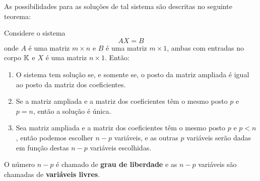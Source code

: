 As possibilidades para as solu\c{c}\~oes de tal sistema s\~ao descritas no seguinte teorema:

\begin{teorema}
	Considere o sistema
	\[
		AX = B
	\]
	onde $A$ \'e uma matriz $m \times n$ e $B$ \'e uma matriz $m \times 1$, ambas com entradas no corpo $\mathbb{K}$ e $X$ \'e uma matriz $n \times 1$. Ent\~ao:
	\begin{enumerate}
		\item O sistema tem solu\c{c}\~ao se, e somente se, o posto da matriz ampliada \'e igual ao posto da matriz dos coeficientes.
		\item Se a matriz ampliada e a matriz dos coeficientes t\^em o mesmo posto $p$ e $p = n$, ent\~ao a solu\c{c}\~ao \'e \'unica.
		\item Sea matriz ampliada e a matriz dos coeficientes t\^em o mesmo posto $p$ e $p < n$, ent\~ao podemos escolher $n - p$ vari\'aveis, e as outras $p$ vari\'aveis ser\~ao dadas em fun\c{c}\~ao destas $n - p$ vari\'aveis escolhidas.
	\end{enumerate}
	O n\'umero $n - p$ \'e chamado de \textbf{grau de liberdade} e as $n - p$ vari\'aveis s\~ao chamadas de \textbf{vari\'aveis livres}.
\end{teorema}
